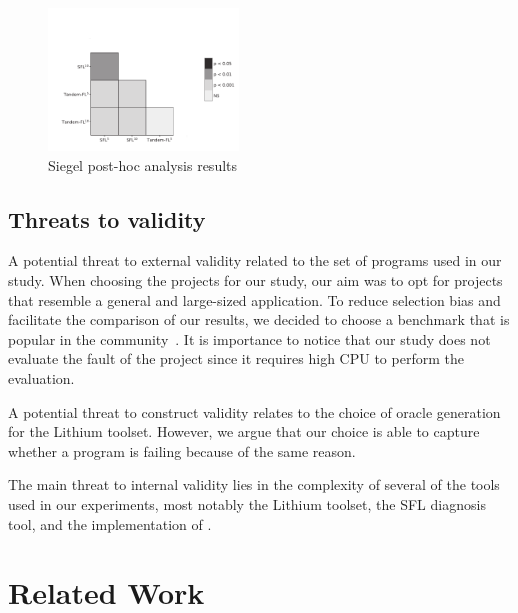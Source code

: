 \documentclass{article}
\begin{document}

\begin{figure}[h]
	\vspace{-1.2cm}
		\includegraphics[width=0.45\textwidth]{figures/heatmap_nemenyi_result.pdf}
		\caption{Siegel post-hoc analysis results}
		\label{fig:performance}
\end{figure}

\subsection{Threats to validity}


%
A potential threat to external validity related to the set of programs used in
our study. When choosing the projects for our study, our aim was to opt for
projects that resemble a general and large-sized application. To reduce
selection bias and facilitate the comparison of our results, we decided to
choose a benchmark that is popular in the community~\cite{just-defects4j-issta2014}.
It is importance to notice that our study does not evaluate the fault of the \closure{}
project since it requires high CPU to perform the  evaluation.

A potential threat to construct validity relates to the choice of oracle generation
for the Lithium toolset. However, we argue that our choice is able to capture whether
a program is failing because of the same reason.

The main threat to internal validity lies in the complexity of several of the tools
used in our experiments, most notably the Lithium toolset, the SFL diagnosis tool,
and the implementation of \comb{}.
%
\section{Related Work}
\end{document}
